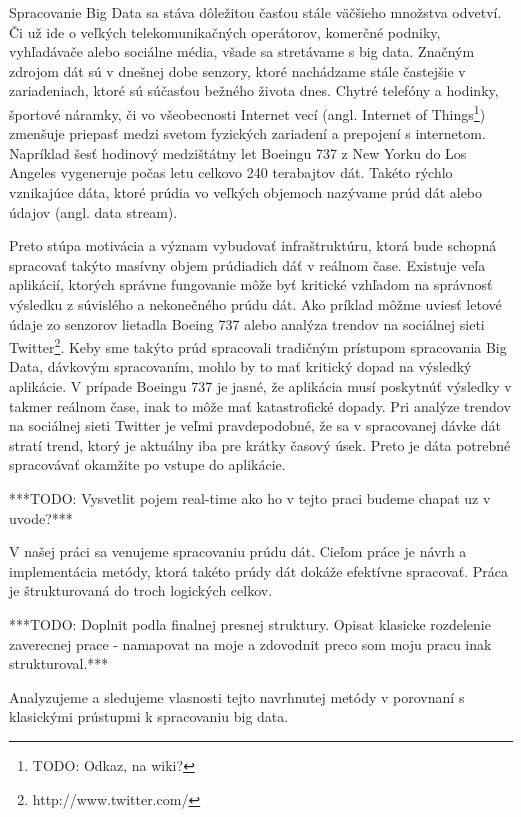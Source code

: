 Spracovanie Big Data sa stáva dôležitou časťou stále väčšieho množstva odvetví. Či už ide o veľkých telekomunikačných operátorov, komerčné podniky, vyhľadávače alebo sociálne média, všade sa stretávame s big data. Značným zdrojom dát sú v dnešnej dobe senzory, ktoré nachádzame stále častejšie v zariadeniach, ktoré sú súčasťou bežného života dnes. Chytré telefóny a hodinky, športové náramky, či vo všeobecnosti Internet vecí (angl. Internet of Things\footnote{TODO: Odkaz, na wiki?}) zmenšuje priepasť medzi svetom fyzických zariadení a prepojení s internetom. Napríklad šesť hodinový medzištátny let Boeingu 737 z New Yorku do Los Angeles vygeneruje počas letu celkovo 240 terabajtov dát\citep{boeing}. Takéto rýchlo vznikajúce dáta, ktoré prúdia vo veľkých objemoch nazývame prúd dát alebo údajov (angl. data stream).
\par
Preto stúpa motivácia a význam vybudovať infraštruktúru, ktorá bude schopná spracovať takýto masívny objem prúdiadich dáť v reálnom čase. Existuje veľa aplikácií, ktorých správne fungovanie môže byť kritické vzhľadom na správnosť výsledku z súvislého a nekonečného prúdu dát. Ako príklad môžme uviesť letové údaje zo senzorov lietadla Boeing 737 alebo analýza trendov na sociálnej sieti Twitter\footnote{http://www.twitter.com/}. Keby sme takýto prúd spracovali tradičným prístupom spracovania Big Data, dávkovým spracovaním, mohlo by to mať kritický dopad na výsledký aplikácie. V prípade Boeingu 737 je jasné, že aplikácia musí poskytnúť výsledky v takmer reálnom čase, inak to môže mať katastrofické dopady. Pri analýze trendov na sociálnej sieti Twitter je veľmi pravdepodobné\citep{mathioudakis2010twittermonitor}, že sa v spracovanej dávke dát stratí trend, ktorý je aktuálny iba pre krátky časový úsek. Preto je dáta potrebné spracovávať okamžite po vstupe do aplikácie.
\begin{shaded}
***TODO: Vysvetlit pojem real-time ako ho v tejto praci budeme chapat uz v uvode?***
\end{shaded}
\par
V našej práci sa venujeme spracovaniu prúdu dát. Cieľom práce je návrh a implementácia metódy, ktorá takéto prúdy dát dokáže efektívne spracovať. Práca je štrukturovaná do troch logických celkov. 
\begin{shaded}
***TODO: Doplnit podla finalnej presnej struktury. Opisat klasicke rozdelenie zaverecnej prace - namapovat na moje a zdovodnit preco som moju pracu inak strukturoval.***
\end{shaded}
Analyzujeme a sledujeme vlasnosti tejto navrhnutej metódy v porovnaní s klasickými prústupmi k spracovaniu big data.


